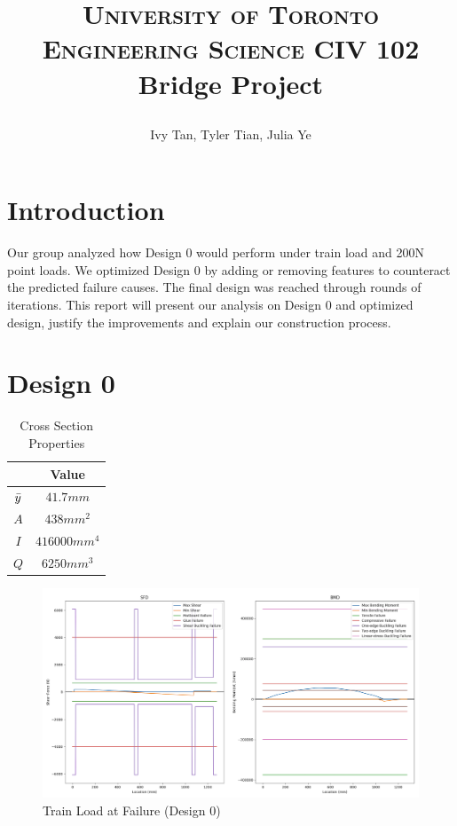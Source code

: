 \documentclass[11pt,twocolumn,letterpaper]{article}
\title{
		\usefont{OT1}{bch}{b}{n}
		\normalfont \normalsize \textsc{University of Toronto Engineering Science CIV 102} \\ [11pt]
		\huge Bridge Project  \\
        
\selectlanguage{english}
\author{Ivy Tan, Tyler Tian, Julia Ye}
}
\begin{document}
\singlespacing
\maketitle

\section*{Introduction}
Our group analyzed how Design 0 would perform under train load and 200N point loads. We optimized Design 0 by adding or removing features to counteract the predicted failure causes. The final design was reached through rounds of iterations. This report will present our analysis on Design 0 and optimized design, justify the improvements and explain our construction process.

\section*{Design 0}
\vspace{-1em}
\begin{table}[h]
\begin{center}
\begin{tabular}{|cc|} 
\hline
\multicolumn{1}{|c}{} & \multicolumn{1}{c|}{Value} \\
\hline
$\Bar{y}$ &   $41.7\si{mm}$ \\
$A$ &   $438\si{mm^2}$ \\
$I$ &   $416000\si{mm^4}$ \\
$Q$ &   $6250\si{mm^3}$ \\
\hline
\end{tabular}
\caption{Cross Section Properties}
\end{center}
\end{table}
\begin{figure}[h]
  \centering
    \includegraphics[width=.4\textwidth]{figures/S,BTrainFailure.png}
    \caption {Train Load at Failure (Design 0)}
    \label{fig:design0_train}
  \hfill
\end{figure}
\end{document}
